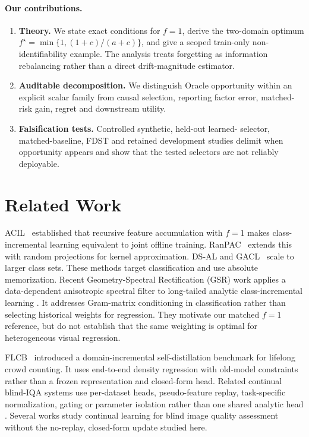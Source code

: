 \documentclass[10pt]{article}
\begin{document}
\paragraph{Our contributions.}
\begin{enumerate}
  \item \textbf{Theory.} We state exact conditions for $f=1$, derive the
    two-domain optimum $f^\star=\min\{1,(1+c)/(a+c)\}$, and give a scoped
    train-only non-identifiability example.  The analysis treats forgetting as
    information rebalancing rather than a direct drift-magnitude estimator.
  \item \textbf{Auditable decomposition.} We distinguish Oracle opportunity
    within an explicit scalar family from causal selection, reporting factor
    error, matched-risk gain, regret and downstream utility.
  \item \textbf{Falsification tests.} Controlled synthetic, held-out learned-
    selector, matched-baseline, FDST and retained development studies delimit
    when opportunity appears and show that the tested selectors are not
    reliably deployable.
\end{enumerate}

\section{Related Work}
\label{sec:related}

ACIL~\citep{zhuang2022acil} established that recursive feature
accumulation with $f=1$ makes class-incremental learning equivalent to
joint offline training. RanPAC~\citep{mcdonnell2023ranpac} extends this
with random projections for kernel approximation.
DS-AL and GACL~\citep{yang2024dsal,gao2024gacl} scale to larger class
sets. These methods target classification and use absolute memorization.
Recent Geometry-Spectral Rectification (GSR) work applies a data-dependent
anisotropic spectral filter to long-tailed analytic class-incremental learning
\citep{tran2026spectral}.  It addresses Gram-matrix conditioning in
classification rather than selecting historical weights for regression.
They motivate our matched $f=1$ reference, but do not establish that the
same weighting is optimal for heterogeneous visual regression.

FLCB~\citep{flcb2022} introduced a domain-incremental self-distillation
benchmark for lifelong crowd counting.  It uses end-to-end density
regression with old-model constraints rather than a frozen representation
and closed-form head.  Related continual blind-IQA systems use per-dataset
heads, pseudo-feature replay, task-specific normalization, gating or parameter
isolation rather than one shared analytic head
\citep{zhang2023biqa_cl,liqa2022,chen2024tsn_iqa,ma2023silf}.
Several works study continual learning for blind image quality assessment
without the no-replay, closed-form update studied here.
\end{document}
